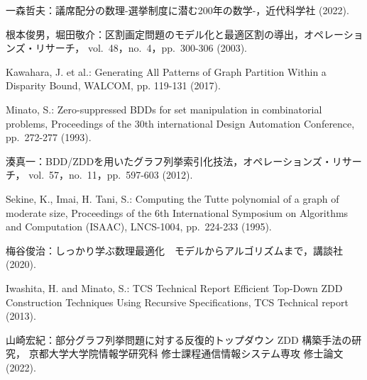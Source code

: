 ﻿\documentclass[a4j,12pt]{jreport}
\begin{document}
\begin{thebibliography}{99}

一森哲夫：議席配分の数理-選挙制度に潜む200年の数学-，近代科学社 (2022).

根本俊男，堀田敬介：区割画定問題のモデル化と最適区割の導出，オペレーションズ・リサーチ，
vol.~48，no.~4，pp.~300-306 (2003).

Kawahara, J. et al.: Generating All Patterns of Graph Partition Within a Disparity Bound,
WALCOM, pp. 119-131 (2017).

Minato, S.: Zero-suppressed BDDs for set manipulation in combinatorial problems,
Proceedings of the 30th international Design Automation Conference,
pp.~272-277 (1993).

湊真一：BDD/ZDDを用いたグラフ列挙索引化技法，オペレーションズ・リサーチ，
vol.~57，no.~11，pp.~597-603 (2012).

Sekine, K., Imai, H. Tani, S.: Computing the Tutte polynomial of a graph of moderate size,
Proceedings of the 6th International Symposium on Algorithms and Computation (ISAAC),
LNCS-1004, pp.~224-233 (1995).

梅谷俊治：しっかり学ぶ数理最適化　モデルからアルゴリズムまで，講談社 (2020).

Iwashita, H. and Minato, S.: TCS Technical Report Efficient Top-Down
ZDD Construction Techniques Using Recursive Specifications,
TCS Technical report (2013).

山崎宏紀：部分グラフ列挙問題に対する反復的トップダウン ZDD 構築手法の研究，
京都大学大学院情報学研究科 修士課程通信情報システム専攻 修士論文 (2022).

\end{thebibliography}

\end{document}
